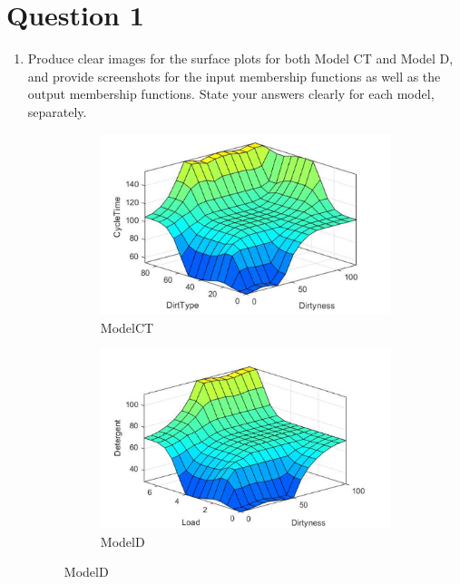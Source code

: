 \documentclass[11pt]{article}
\begin{document}

\section*{Question 1}

\begin{enumerate}[label=(\alph*)]

  \item Produce clear images for the surface plots for both Model CT and Model
  D, and provide screenshots for the input membership functions as well as the
  output membership functions. State your answers clearly for each model,
  separately.

  \begin{figure}[ht!]
  \centering
  \begin{subfigure}{.5\textwidth}
    \centering
    \includegraphics[width=.9\linewidth]{res/image1}
    \caption{ModelCT}
    \label{fig:sub1}
  \end{subfigure}%
  \begin{subfigure}{.5\textwidth}
    \centering
    \includegraphics[width=.9\linewidth]{res/image2}
    \caption{ModelD}
    \label{fig:sub2}
  \end{subfigure}
  \end{figure}


\end{enumerate}
\end{document}
